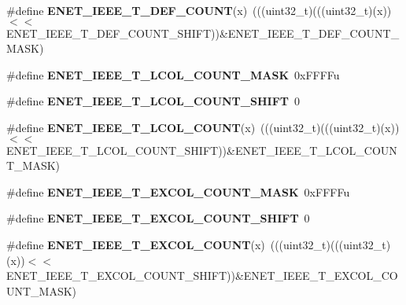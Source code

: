 \begin{DoxyCompactItemize}
\item 
\#define {\bfseries E\+N\+E\+T\+\_\+\+I\+E\+E\+E\+\_\+\+T\+\_\+\+D\+E\+F\+\_\+\+C\+O\+U\+NT}(x)~(((uint32\+\_\+t)(((uint32\+\_\+t)(x))$<$$<$E\+N\+E\+T\+\_\+\+I\+E\+E\+E\+\_\+\+T\+\_\+\+D\+E\+F\+\_\+\+C\+O\+U\+N\+T\+\_\+\+S\+H\+I\+FT))\&E\+N\+E\+T\+\_\+\+I\+E\+E\+E\+\_\+\+T\+\_\+\+D\+E\+F\+\_\+\+C\+O\+U\+N\+T\+\_\+\+M\+A\+SK)\hypertarget{group__ENET__Register__Masks_ga31ed2c1faca96c342cc4f2f9cc304d23}{}\label{group__ENET__Register__Masks_ga31ed2c1faca96c342cc4f2f9cc304d23}

\item 
\#define {\bfseries E\+N\+E\+T\+\_\+\+I\+E\+E\+E\+\_\+\+T\+\_\+\+L\+C\+O\+L\+\_\+\+C\+O\+U\+N\+T\+\_\+\+M\+A\+SK}~0x\+F\+F\+F\+Fu\hypertarget{group__ENET__Register__Masks_ga041ada9082f15cabd8d535dba84fbfba}{}\label{group__ENET__Register__Masks_ga041ada9082f15cabd8d535dba84fbfba}

\item 
\#define {\bfseries E\+N\+E\+T\+\_\+\+I\+E\+E\+E\+\_\+\+T\+\_\+\+L\+C\+O\+L\+\_\+\+C\+O\+U\+N\+T\+\_\+\+S\+H\+I\+FT}~0\hypertarget{group__ENET__Register__Masks_ga2c352d386efb6087a1449f6ff8e49e28}{}\label{group__ENET__Register__Masks_ga2c352d386efb6087a1449f6ff8e49e28}

\item 
\#define {\bfseries E\+N\+E\+T\+\_\+\+I\+E\+E\+E\+\_\+\+T\+\_\+\+L\+C\+O\+L\+\_\+\+C\+O\+U\+NT}(x)~(((uint32\+\_\+t)(((uint32\+\_\+t)(x))$<$$<$E\+N\+E\+T\+\_\+\+I\+E\+E\+E\+\_\+\+T\+\_\+\+L\+C\+O\+L\+\_\+\+C\+O\+U\+N\+T\+\_\+\+S\+H\+I\+FT))\&E\+N\+E\+T\+\_\+\+I\+E\+E\+E\+\_\+\+T\+\_\+\+L\+C\+O\+L\+\_\+\+C\+O\+U\+N\+T\+\_\+\+M\+A\+SK)\hypertarget{group__ENET__Register__Masks_ga3b0b578f77880f92db4d4515d5307a67}{}\label{group__ENET__Register__Masks_ga3b0b578f77880f92db4d4515d5307a67}

\item 
\#define {\bfseries E\+N\+E\+T\+\_\+\+I\+E\+E\+E\+\_\+\+T\+\_\+\+E\+X\+C\+O\+L\+\_\+\+C\+O\+U\+N\+T\+\_\+\+M\+A\+SK}~0x\+F\+F\+F\+Fu\hypertarget{group__ENET__Register__Masks_ga4b5fe7076adb4e19e1271ca3f6f27d16}{}\label{group__ENET__Register__Masks_ga4b5fe7076adb4e19e1271ca3f6f27d16}

\item 
\#define {\bfseries E\+N\+E\+T\+\_\+\+I\+E\+E\+E\+\_\+\+T\+\_\+\+E\+X\+C\+O\+L\+\_\+\+C\+O\+U\+N\+T\+\_\+\+S\+H\+I\+FT}~0\hypertarget{group__ENET__Register__Masks_gab0ed20dee5a8a4ad851053c9bb9359e8}{}\label{group__ENET__Register__Masks_gab0ed20dee5a8a4ad851053c9bb9359e8}

\item 
\#define {\bfseries E\+N\+E\+T\+\_\+\+I\+E\+E\+E\+\_\+\+T\+\_\+\+E\+X\+C\+O\+L\+\_\+\+C\+O\+U\+NT}(x)~(((uint32\+\_\+t)(((uint32\+\_\+t)(x))$<$$<$E\+N\+E\+T\+\_\+\+I\+E\+E\+E\+\_\+\+T\+\_\+\+E\+X\+C\+O\+L\+\_\+\+C\+O\+U\+N\+T\+\_\+\+S\+H\+I\+FT))\&E\+N\+E\+T\+\_\+\+I\+E\+E\+E\+\_\+\+T\+\_\+\+E\+X\+C\+O\+L\+\_\+\+C\+O\+U\+N\+T\+\_\+\+M\+A\+SK)\hypertarget{group__ENET__Register__Masks_gaa05aef85a08b9877b13aa21b4b414443}{}\label{group__ENET__Register__Masks_gaa05aef85a08b9877b13aa21b4b414443}


\end{DoxyCompactItemize}
